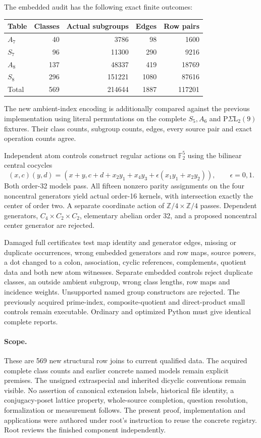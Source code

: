 \documentclass[11pt]{article}
\begin{document}
The embedded audit has the following exact finite outcomes:
\begin{center}\begin{tabular}{lrrrr}
Table & Classes & Actual subgroups & Edges & Row pairs\\\hline
$A_7$ &40&3786&98&1600\\
$S_7$ &96&11300&290&9216\\
$A_8$ &137&48337&419&18769\\
$S_8$ &296&151221&1080&87616\\\hline
Total&569&214644&1887&117201
\end{tabular}\end{center}
The new ambient-index encoding is additionally compared against the
previous implementation using literal permutations on the complete $S_5,A_6$
and $\mathrm P\Sigma\mathrm L_2(9)$ fixtures. Their class counts, subgroup
counts, edges, every source pair and exact operation counts agree.

Independent atom controls construct regular actions on $\mathbb F_2^5$
using the bilinear central cocycles
\[
(x,c)(y,d)=(x+y,c+d+x_2y_1+x_4y_3+
\epsilon(x_1y_1+x_2y_2)),\qquad \epsilon=0,1.
\]
Both order-32 models pass. All fifteen nonzero parity assignments on the
four noncentral generators yield actual order-16 kernels, with intersection
exactly the center of order two. A separate coordinate action of
$\mathbb Z/4\times\mathbb Z/4$ passes. Dependent generators,
$C_4\times C_2\times C_2$, elementary abelian order 32, and a proposed
noncentral center generator are rejected.

Damaged full certificates test map identity and generator edges, missing
or duplicate occurrences, wrong embedded generators and row maps, source
powers, a dot changed to a colon, association, cyclic references,
complements, quotient data and both new atom witnesses. Separate embedded
controls reject duplicate classes, an outside ambient subgroup, wrong
class lengths, row maps and incidence weights. Unsupported named group
constructors are rejected. The previously acquired prime-index,
composite-quotient and direct-product small controls remain executable.
Ordinary and optimized Python must give identical complete reports.

\paragraph{Scope.}
These are 569 new structural row joins to current qualified data. The
acquired complete class counts and earlier concrete named models remain
explicit premises. The unsigned extraspecial and inherited dicyclic
conventions remain visible. No assertion of canonical extension labels,
historical file identity, a conjugacy-poset lattice property, whole-source
completion, question resolution, formalization or measurement follows.
The present proof, implementation and applications were authored under
root's instruction to reuse the concrete registry. Root reviews the
finished component independently.
\end{document}

